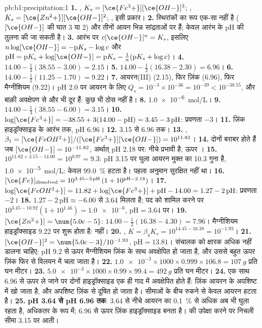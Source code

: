 \begin{solution}{pb:b1:precipitation:1}
\textbf{1.} , $K_s = [\ce{Fe^3+}][\ce{OH-}]^3$;
, $K_s = [\ce{Zn^2+}][\ce{OH-}]^2$;
, इसी प्रकार।
\textbf{2.} स्थिरांकों का रूप एक-सा नहीं है ($[\ce{OH-}]$ की घात 3 या 2)
और तीनों आयन भिन्न सांद्रताओं पर हैं; केवल
आरंभ के pH की तुलना की जा सकती है।
\textbf{3.} आरंभ पर $c[\ce{OH-}]^n = K_s$, इसलिए $n\log[\ce{OH-}] =
-\mathrm{p}K_s - \log c$ और $\mathrm{pH} = \mathrm{p}K_e +
\log[\ce{OH-}] = \mathrm{p}K_e - \frac1n(\mathrm{p}K_s + \log c)$।
\textbf{4.} $14.00 - \frac13(38.55 - 3.00) = 2.15$।
\textbf{5.} $14.00 - \frac12(16.38 - 2.30) = 6.96$।
\textbf{6.} $14.00 - \frac12(11.25 - 1.70) = 9.22$।
\textbf{7.} आयरन(III) (2.15), फिर ज़िंक (6.96), फिर मैग्नीशियम (9.22)।
pH 2.0 पर आयरन के लिए $Q_s = 10^{-3} \times 10^{-36} = 10^{-39} < 10^{-38.55}$,
और बाक़ी अवक्षेपण से और भी दूर हैं: कुछ भी ठोस नहीं है।
\textbf{8.} \qty{1.0e-6}{mol/L}।
\textbf{9.} $14.00 - \frac13(38.55 - 6.00) = 3.15$।
\textbf{10.} $\log[\ce{Fe^3+}] = -38.55 + 3(14.00 - \mathrm{pH}) = 3.45 -
3\,\mathrm{pH}$: प्रवणता $-3$।
\textbf{11.} ज़िंक हाइड्रॉक्साइड के आरंभ तक, pH 6.96।
\textbf{12.} 3.15 से 6.96 तक।
\textbf{13.} , $\beta_1 =
[\ce{FeOH^2+}]/([\ce{Fe^3+}][\ce{OH-}]) = 10^{11.82}$।
\textbf{14.} दोनों बराबर होते हैं जब $[\ce{OH-}] = 10^{-11.82}$, अर्थात् pH 2.18 पर:
नीचे  प्रभावी है, ऊपर ।
\textbf{15.} $10^{11.82 + 3.15 - 14.00} = 10^{0.97} = 9.3$: pH 3.15 पर
घुला आयरन मुक्त  का 10.3 गुना है, \qty{1.0e-5}{mol/L}:
केवल \qty{99.0}{\percent} हटता है। पहला अनुमान सुरक्षित नहीं था।
\textbf{16.} $[\ce{Fe}]_{\mathrm{dissolved}} = 10^{3.45 - 3\,\mathrm{pH}}\,
(1 + 10^{\mathrm{pH} - 2.18})$।
\textbf{17.} $\log[\ce{FeOH^2+}] = 11.82 + \log[\ce{Fe^3+}] + \mathrm{pH} -
14.00 = 1.27 - 2\,\mathrm{pH}$: प्रवणता $-2$।
\textbf{18.} $1.27 - 2\,\mathrm{pH} \approx -6.00$ से 3.64 मिलता है;
 पद को शामिल करने पर $10^{3.45 - 10.92}(1 + 10^{1.46}) =
\num{1.0e-6}$, $\mathrm{pH} = 3.64$ पर।
\textbf{19.} $[\ce{Zn^2+}] = \num{5.0e-5}$: $14.00 - \frac12(16.38 - 4.30) =
7.96$। मैग्नीशियम हाइड्रॉक्साइड 9.22 पर शुरू होता है: नहीं।
\textbf{20.} , $K = \beta_4 K_s =
10^{14.45 - 16.38} = 10^{-1.93}$।
\textbf{21.} $[\ce{OH-}]^2 = \num{5.0e-3}/10^{-1.93}$, $\mathrm{pH} =
13.81$। संचालक को क्षारक अधिक नहीं डालना चाहिए: pH 9.2 से ऊपर
मैग्नीशियम ज़िंक के साथ अवक्षेपित हो जाता है, और उससे बहुत ऊपर ज़िंक फिर से
विलयन में चला जाता है।
\textbf{22.} $\num{1.0e-3} \times 1000 \times 0.999 \times 106.8 =
\qty{107}{g}$ प्रति घन मीटर।
\textbf{23.} $\num{5.0e-3} \times 1000 \times 0.99 \times 99.4 =
\qty{492}{g}$ प्रति घन मीटर।
\textbf{24.} एक साथ 6.96 से ऊपर ले जाने पर दोनों हाइड्रॉक्साइड एक ही
गाद में अवक्षेपित होते हैं: ज़िंक आयरन के अपशिष्ट में खो जाता है, और अपशिष्ट
ज़िंक से दूषित हो जाता है। सीमाओं के बीच रुकने से केवल आयरन
हटता है।
\textbf{25.} \textbf{pH 3.64 से pH 6.96 तक}: 3.64 से नीचे आयरन का
\qty{0.1}{\percent} से अधिक अब भी घुला रहता है, अधिकतर  के रूप में;
6.96 से ऊपर ज़िंक हाइड्रॉक्साइड बनता है।  की उपेक्षा करने पर
निचली सीमा 3.15 पर आती।
\end{solution}
